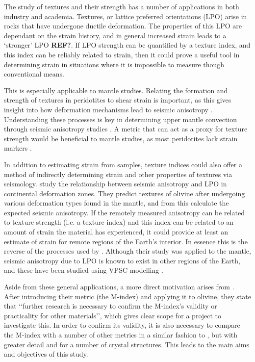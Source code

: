 \documentclass[a4paper,12pt]{report}
\numberwithin{equation}{chapter}
\begin{document}
The study of textures and their strength has a number of applications in both industry and academia. Textures, or lattice preferred orientations (LPO) arise in rocks that have undergone ductile deformation. The properties of this LPO are dependant on the strain history, and in general increased strain leads to a \lq{}stronger\rq{} LPO \textbf{REF?}. If LPO strength can be quantified by a texture index, and this index can be reliably related to strain, then it could prove a useful tool in determining strain in situations where it is impossible to measure though conventional means.

This is especially applicable to mantle studies. Relating the formation and strength of textures in peridotites to shear strain is important, as this gives insight into how deformation mechanisms lead to seismic anisotropy \citep{Warren2008}. Understanding these processes is key in determining upper mantle convection through seismic anisotropy studies \citep[e.g.][]{Blackman2002}. A metric that can act as a proxy for texture strength would be beneficial to mantle studies, as most peridotites lack strain markers \citep{Tommasi2000}.

In addition to estimating strain from samples, texture indices could also offer a method of indirectly determining strain and other properties of textures via seismology. \cite{Tommasi1999} study the relationship between seismic anisotropy and LPO in continental deformation zones. They predict textures of olivine after undergoing various deformation types found in the mantle, and from this calculate the expected seismic anisotropy. If the remotely measured anisotropy can be related to texture strength (i.e. a texture index) and this index can be related to an amount of strain the material has experienced, it could provide at least an estimate of strain for remote regions of the Earth's interior. In essence this is the reverse of the processes used by \cite{Tommasi1999}. Although their study was applied to the mantle, seismic anisotropy due to LPO is known to exist in other regions of the Earth, and these have been studied using VPSC modelling \citep[e.g.][]{Wenk1999}.   

Aside from these general applications, a more direct motivation arises from \cite{Skemer}. After introducing their metric (the M-index) and applying it to olivine, they state that \lq\lq{}further research is necessary to confirm the M-index's validity or practicality for other materials\rq\rq{}, which gives clear scope for a project to investigate this. In order to confirm its validity, it is also necessary to compare the M-index with a number of other metrics in a similar fashion to \cite{Mainprice}, but with greater detail and for a number of crystal structures. This leads to the main aims and objectives of this study.   
\end{document}
